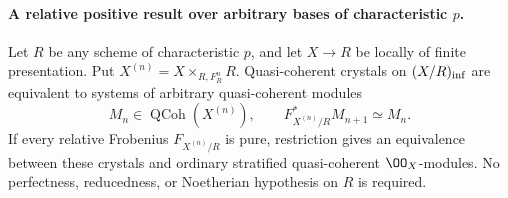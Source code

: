 \paragraph{A relative positive result over arbitrary bases of characteristic $p$.}

\begin{proposition}\label{prop:DE-E2-relative-Frobenius}
Let $R$ be any scheme of characteristic $p$, and let $X\to R$ be locally of finite presentation.  Put $X^{(n)}=X\times_{R,F_R^n}R$.  Quasi-coherent crystals on $(X/R)_{\rm inf}$ are equivalent to systems of arbitrary quasi-coherent modules
\[
 M_n\in\operatorname{QCoh}(X^{(n)}),\qquad
 F_{X^{(n)}/R}^*M_{n+1}\simeq M_n.
\]
If every relative Frobenius $F_{X^{(n)}/R}$ is pure, restriction gives an equivalence between these crystals and ordinary stratified quasi-coherent $\OO_X$-modules.  No perfectness, reducedness, or Noetherian hypothesis on $R$ is required.
\end{proposition}
